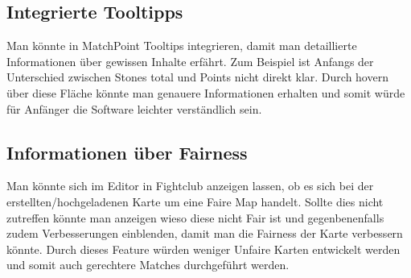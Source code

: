 \subsection{Integrierte Tooltipps}\label{subsec:integrierte-tooltipps}
Man k\"onnte in MatchPoint Tooltips integrieren, damit man detaillierte Informationen \"uber gewissen Inhalte erf\"ahrt.
Zum Beispiel ist Anfangs der Unterschied zwischen Stones total und Points nicht direkt klar.
Durch hovern \"uber diese Fl\"ache k\"onnte man genauere Informationen erhalten und somit w\"urde f\"ur Anf\"anger die Software leichter verst\"andlich sein.

\subsection{Informationen \"uber Fairness}\label{subsec:informationen-ueber-fairness}
Man k\"onnte sich im Editor in Fightclub anzeigen lassen, ob es sich bei der erstellten/hochgeladenen Karte um eine Faire Map handelt.
Sollte dies nicht zutreffen k\"onnte man anzeigen wieso diese nicht Fair ist und gegenbenenfalls zudem Verbesserungen einblenden, damit man die Fairness der Karte verbessern k\"onnte.
Durch dieses Feature w\"urden weniger Unfaire Karten entwickelt werden und somit auch gerechtere Matches durchgef\"uhrt werden.

\bigskip
\newpage